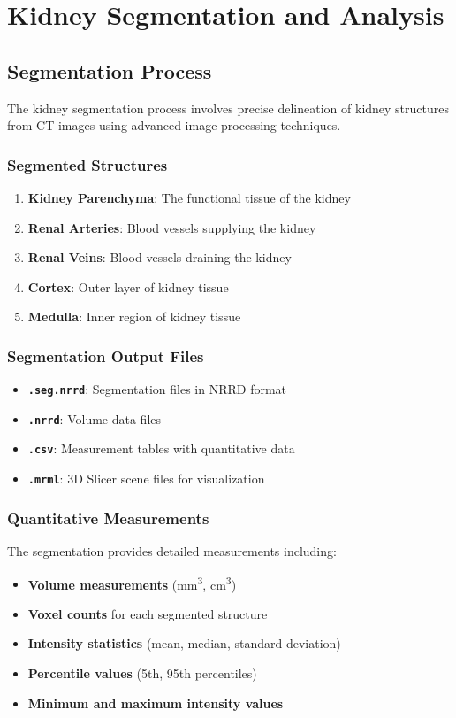 \documentclass{article}
\begin{document}
\section{Kidney Segmentation and Analysis}

\subsection{Segmentation Process}

The kidney segmentation process involves precise delineation of kidney structures from CT images using advanced image processing techniques.

\subsubsection{Segmented Structures}
\begin{enumerate}
    \item \textbf{Kidney Parenchyma}: The functional tissue of the kidney
    \item \textbf{Renal Arteries}: Blood vessels supplying the kidney
    \item \textbf{Renal Veins}: Blood vessels draining the kidney
    \item \textbf{Cortex}: Outer layer of kidney tissue
    \item \textbf{Medulla}: Inner region of kidney tissue
\end{enumerate}

\subsubsection{Segmentation Output Files}
\begin{itemize}
    \item \textbf{\texttt{.seg.nrrd}}: Segmentation files in NRRD format
    \item \textbf{\texttt{.nrrd}}: Volume data files
    \item \textbf{\texttt{.csv}}: Measurement tables with quantitative data
    \item \textbf{\texttt{.mrml}}: 3D Slicer scene files for visualization
\end{itemize}

\subsubsection{Quantitative Measurements}
The segmentation provides detailed measurements including:
\begin{itemize}
    \item \textbf{Volume measurements} (mm\textsuperscript{3}, cm\textsuperscript{3})
    \item \textbf{Voxel counts} for each segmented structure
    \item \textbf{Intensity statistics} (mean, median, standard deviation)
    \item \textbf{Percentile values} (5th, 95th percentiles)
    \item \textbf{Minimum and maximum intensity values}
\end{itemize}
\end{document}

